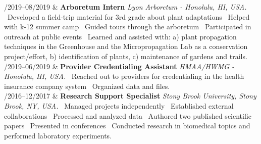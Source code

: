 \documentclass[11pt, a4paper]{article}
\newcommand{\Duration}[2]{\fontsize{10pt}{0}\selectfont #1--#2}
\begin{document}
\begin{EntriesTable}


	\Duration{06/2019}{08/2019}  &
	\textbf{Arboretum Intern}
	\newline
	\textit{Lyon Arboretum - Honolulu, HI, USA.}
	\newline
	\textbullet \ Developed a field-trip material for 3rd grade about plant adaptations
	\textbullet \ Helped with k-12 summer camp
	\textbullet \ Guided tours through the arboretum
	\textbullet \ Participated in outreach at public events
	\textbullet \ Learned and assisted with: a) plant propagation techniques in the Greenhouse and
	the Micropropagation Lab as a conservation project/effort, b) identification of plants, c)
	maintenance of gardens and trails.
	\\

	\Duration{03/2019}{06/2019}  &
	\textbf{Provider Credentialing Assistant}
	\newline
	\textit{HMAA/HWMG - Honolulu, HI, USA.}
	\newline
	\textbullet \ Reached out to providers for credentialing in the health insurance company system
	\textbullet \ Organized data and files.
	\\

	\Duration{08/2016}{12/2017}  &
	\textbf{Research Support Specialist}
	\newline
	\textit{Stony Brook University, Stony Brook, NY, USA.}
	\newline
	\textbullet \ Managed projects independently
	\textbullet \ Established external collaborations
	\textbullet \ Processed and analyzed data
	\textbullet \ Authored two published scientific papers
	\textbullet \ Presented in conferences
	\textbullet\ Conducted research in biomedical topics and performed laboratory experiments.
	\\

\end{EntriesTable}
\end{document}
